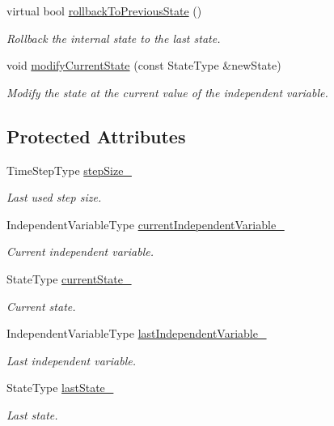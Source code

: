 \begin{DoxyCompactItemize}
virtual bool \hyperlink{classtudat_1_1numerical__integrators_1_1EulerIntegrator_a030f7c176b3b5d6a36f7d2c090be5e35}{rollback\+To\+Previous\+State} ()
\begin{DoxyCompactList}\small\item\em Rollback the internal state to the last state. \end{DoxyCompactList}\item 
void \hyperlink{classtudat_1_1numerical__integrators_1_1EulerIntegrator_a3f297ad8906048dcb955e674d7c9cb0b}{modify\+Current\+State} (const State\+Type \&new\+State)
\begin{DoxyCompactList}\small\item\em Modify the state at the current value of the independent variable. \end{DoxyCompactList}\end{DoxyCompactItemize}
\subsection*{Protected Attributes}
\begin{DoxyCompactItemize}
\item 
Time\+Step\+Type \hyperlink{classtudat_1_1numerical__integrators_1_1EulerIntegrator_a41ae773d51024c4388cba602ede31c58}{step\+Size\+\_\+}
\begin{DoxyCompactList}\small\item\em Last used step size. \end{DoxyCompactList}\item 
Independent\+Variable\+Type \hyperlink{classtudat_1_1numerical__integrators_1_1EulerIntegrator_a796713263d79972f32b6a6d600cb34ee}{current\+Independent\+Variable\+\_\+}
\begin{DoxyCompactList}\small\item\em Current independent variable. \end{DoxyCompactList}\item 
State\+Type \hyperlink{classtudat_1_1numerical__integrators_1_1EulerIntegrator_a923da3b83abbfd6ac4ff9da7a9695eda}{current\+State\+\_\+}
\begin{DoxyCompactList}\small\item\em Current state. \end{DoxyCompactList}\item 
Independent\+Variable\+Type \hyperlink{classtudat_1_1numerical__integrators_1_1EulerIntegrator_a19d04fd16d5ef487d089007f44315ee3}{last\+Independent\+Variable\+\_\+}
\begin{DoxyCompactList}\small\item\em Last independent variable. \end{DoxyCompactList}\item 
State\+Type \hyperlink{classtudat_1_1numerical__integrators_1_1EulerIntegrator_acf89c8e5e22c6836f2479468a595216a}{last\+State\+\_\+}
\begin{DoxyCompactList}\small\item\em Last state. \end{DoxyCompactList}\end{DoxyCompactItemize}
